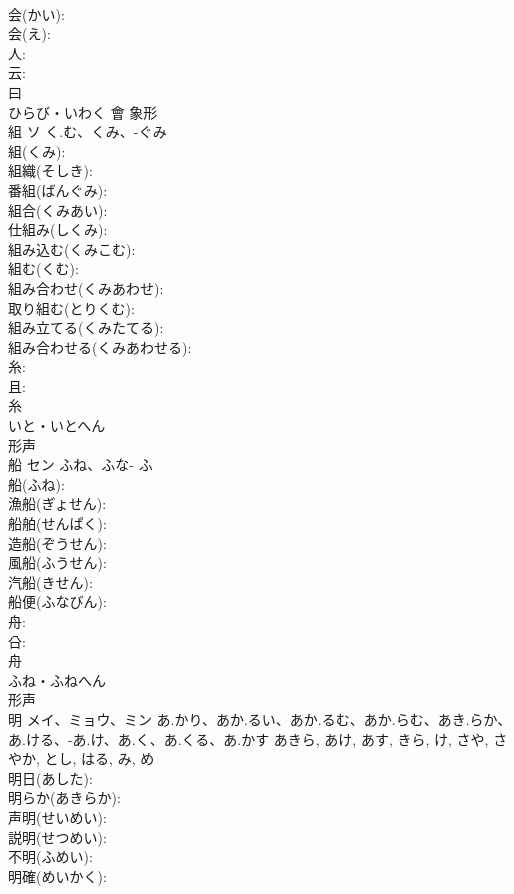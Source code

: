 \documentclass[8pt]{extreport}
\begin{document}
\begin{CJK}{UTF8}{min}
\\	会(かい): 
\\	会(え): 
\\	人: 
\\	云: 
\\	曰	
\\	ひらび・いわく	會	象形 
\\	組	ソ	く.む、くみ、-ぐみ		
\\	組(くみ): 
\\	組織(そしき): 
\\	番組(ばんぐみ): 
\\	組合(くみあい): 
\\	仕組み(しくみ): 
\\	組み込む(くみこむ): 
\\	組む(くむ): 
\\	組み合わせ(くみあわせ): 
\\	取り組む(とりくむ): 
\\	組み立てる(くみたてる): 
\\	組み合わせる(くみあわせる): 
\\	糸: 
\\	且: 
\\	糸	
\\	いと・いとへん	
\\	形声 
\\	船	セン	ふね、ふな-	ふ	
\\	船(ふね): 
\\	漁船(ぎょせん): 
\\	船舶(せんぱく): 
\\	造船(ぞうせん): 
\\	風船(ふうせん): 
\\	汽船(きせん): 
\\	船便(ふなびん): 
\\	舟: 
\\	㕣: 
\\	舟	
\\	ふね・ふねへん	
\\	形声 
\\	明	メイ、ミョウ、ミン	あ.かり、あか.るい、あか.るむ、あか.らむ、あき.らか、あ.ける、-あ.け、あ.く、あ.くる、あ.かす	あきら, あけ, あす, きら, け, さや, さやか, とし, はる, み, め	
\\	明日(あした): 
\\	明らか(あきらか): 
\\	声明(せいめい): 
\\	説明(せつめい): 
\\	不明(ふめい): 
\\	明確(めいかく): 

\end{CJK}
\end{document}

